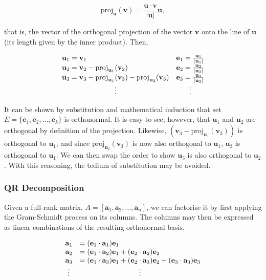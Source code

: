 \documentclass[11pt]{amsart}
\begin{document}
$$\text{proj}_{\mathbf{u}}(\mathbf{v}) = \frac{\mathbf{u}\cdot\mathbf{v}}{|\mathbf{u}|}\mathbf{u},$$

that is, the vector of the orthogonal projection of the vector $\mathbf{v}$ onto the line of $\mathbf{u}$ (its length given by the inner product). Then,

\begin{align}
\begin{array}{lr}
\mathbf{u}_1 = \mathbf{v}_1 & \mathbf{e}_1 = \frac{\mathbf{u}_1}{|\mathbf{u}_1|} \notag \\
\mathbf{u}_2 = \mathbf{v}_2 - \text{proj}_{\mathbf{u}_1}(\mathbf{v}_2) & \mathbf{e}_2 = \frac{\mathbf{u}_2}{|\mathbf{u}_2|}  \notag \\
\mathbf{u}_3 = \mathbf{v}_3 - \text{proj}_{\mathbf{u}_1}(\mathbf{v}_3) - \text{proj}_{\mathbf{u}_2}(\mathbf{v}_3) & \mathbf{e}_3 = \frac{\mathbf{u}_3}{|\mathbf{u}_3|}  \notag \\
\multicolumn{1}{c}{\vdots} & \multicolumn{1}{c}{\vdots} \notag
\end{array}
\end{align}

It can be shown by substitution and mathematical induction that set $E = \{\mathbf{e}_1, \mathbf{e}_2, \dots, \mathbf{e}_k\}$ is orthonormal. It is easy to see, however, that $\mathbf{u}_1$ and $\mathbf{u}_2$ are orthogonal by definition of the projection. Likewise, $(\mathbf{v}_3 - \text{proj}_{\mathbf{u}_1}(\mathbf{v}_3))$ is orthogonal to $\mathbf{u}_1$, and since $\text{proj}_{\mathbf{u}_2}(\mathbf{v}_3)$ is now also orthogonal to $\mathbf{u}_1$, $\mathbf{u}_3$ is orthogonal to $\mathbf{u}_1$. We can then swap the order to show $\mathbf{u}_3$ is also orthogonal to $\mathbf{u}_2$. With this reasoning, the tedium of substitution may be avoided.

\subsubsection{QR Decomposition}

Given a full-rank matrix, $A = [\mathbf{a}_1, \mathbf{a}_2, \dots, \mathbf{a}_n]$, we can factorise it by first applying the Gram-Schmidt process on its columns. The columns may then be expressed as linear combinations of the resulting orthonormal basis,

\begin{align}
\begin{array}{ll}
\mathbf{a}_1 &= (\mathbf{e}_1 \cdot \mathbf{a}_1) \mathbf{e}_1 \notag \\
\mathbf{a}_2 &= (\mathbf{e}_1 \cdot \mathbf{a}_2) \mathbf{e}_1 + (\mathbf{e}_2 \cdot \mathbf{a}_2) \mathbf{e}_2 \notag \\
\mathbf{a}_3 &= (\mathbf{e}_1 \cdot \mathbf{a}_3) \mathbf{e}_1 + (\mathbf{e}_2 \cdot \mathbf{a}_3) \mathbf{e}_2 + (\mathbf{e}_3 \cdot \mathbf{a}_3) \mathbf{e}_3 \notag \\
\multicolumn{1}{c}{\vdots} & \multicolumn{1}{c}{\vdots} \notag
\end{array}
\end{align}
\end{document}
